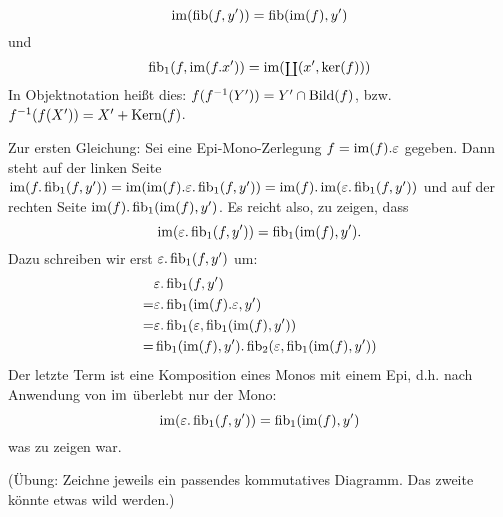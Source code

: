 \begin{lemm}[Regel (e)]
\[
\im(\fib(f,y')) = \fib(\im(f),y')
\]
und
\[
\fib_1(f,\im(f.x')) = \im(\coprodop(x', \ker(f)))
\]
In Objektnotation heißt dies: $f(f^{-1}(Y')) = Y' \cap \Bild(f)$, bzw. $f^{-1}(f(X')) = X' + \Kern(f)$.
\end{lemm}
\begin{bew}
Zur ersten Gleichung:
Sei eine Epi-Mono-Zerlegung $f=\im(f).\varepsilon$ gegeben.
Dann steht auf der linken Seite $\im(f.\fib_1(f,y')) = \im(\im(f).\varepsilon.\fib_1(f,y')) = \im(f).\im(\varepsilon.\fib_1(f,y'))$ und auf der rechten Seite $\im(f).\fib_1(\im(f),y')$. Es reicht also, zu zeigen, dass
\[ \im(\varepsilon.\fib_1(f,y')) = \fib_1(\im(f),y'). \]
Dazu schreiben wir erst $\varepsilon.\fib_1(f,y')$ um:
\begin{align*}
&\varepsilon.\fib_1(f,y')
\\=& \varepsilon.\fib_1(\im(f).\varepsilon,y')
\\=& \varepsilon.\fib_1(\varepsilon,\fib_1(\im(f),y'))
\\=& \fib_1(\im(f),y').\fib_2(\varepsilon,\fib_1(\im(f),y'))
\end{align*}
Der letzte Term ist eine Komposition eines Monos mit einem Epi, d.h. nach Anwendung von $\im$ überlebt nur der Mono:
\[ \im(\varepsilon.\fib_1(f,y')) = \fib_1(\im(f),y') \]
was zu zeigen war.

% 
% 
% 
(Übung: Zeichne jeweils ein passendes kommutatives Diagramm. Das zweite könnte etwas wild werden.)
\end{bew}

